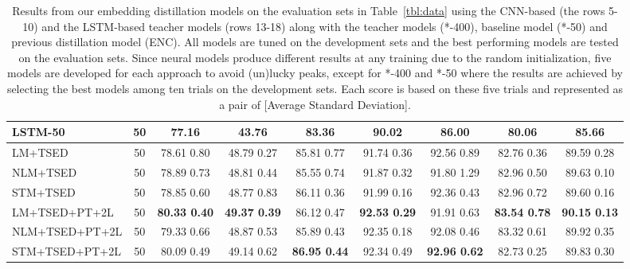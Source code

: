 \documentclass{article}
\begin{document}
\begin{table*}[htb!]
{\begin{tabular}{l:c||c|c|c|c|c|c|c}
			LSTM-50       &     50  &       77.16           &          43.76           &          83.36           &          90.02           &          86.00           &          80.06           &            85.66             \\ \hline
			LM+TSED        &  50  &     78.61 0.80      &     48.79 0.27      &     85.81 0.77      &     91.74 0.36      & 92.56 0.89 &     82.76 0.36      &       89.59 0.28        \\
			NLM+TSED       &  50  & 78.89 0.73 & 48.81 0.44 &     85.55 0.74      &     91.87 0.32      &     91.80 1.29      & 82.96 0.50 &   89.63 0.10   \\
			STM+TSED       &  50  &     78.85 0.60      &     48.77 0.83      & 86.11 0.36 & 91.99 0.16 &     92.36 0.43      &     82.96 0.72      &       89.60 0.16        \\ \hline
			LM+TSED+PT+2L  &  50  & \textbf{80.33 0.40} & \textbf{49.37 0.39} &     86.12 0.47      & \textbf{92.53 0.29} &     91.91 0.63      & \textbf{83.54 0.78} &   \textbf{90.15 0.13}   \\
			NLM+TSED+PT+2L &    50  &   79.33 0.66      &     48.87 0.53      &     85.89 0.43      &     92.35 0.18      &     92.08 0.46      &     83.32 0.61      &       89.92 0.35        \\
			STM+TSED+PT+2L &     50  &  80.09 0.49      &     49.14 0.62      & \textbf{86.95 0.44} &     92.34 0.49      & \textbf{92.96 0.62} &     82.73 0.25      &       89.83 0.30
	\end{tabular}}
	\caption{Results from our embedding distillation models on the evaluation sets in Table~\ref{tbl:data} using the CNN-based (the rows 5-10) and the LSTM-based teacher models (rows 13-18) along with the teacher models (*-400), baseline model (*-50) and previous distillation model (ENC).
		All models are tuned on the development sets and the best performing models are tested on the evaluation sets.
		Since neural models produce different results at any training due to the random initialization, five models are developed for each approach to avoid (un)lucky peaks, except for *-400 and *-50 where the results are achieved by selecting the best models among ten trials on the development sets.
		Each score is based on these five trials and represented as a pair of [Average  Standard Deviation].}
\label{tbl:comparison}
\end{table*}
\end{document}
